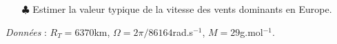 \documentclass{report}
\begin{document}
\begin{itemize}
	\item[$\clubsuit$] Estimer la valeur typique de la vitesse des vents dominants en Europe.

\end{itemize}

\textit{Données} : $R_T=6370$km, $\Omega=2\pi/86164$rad.s$^{-1}$, $M=29$g.mol$^{-1}$.
\end{document}
